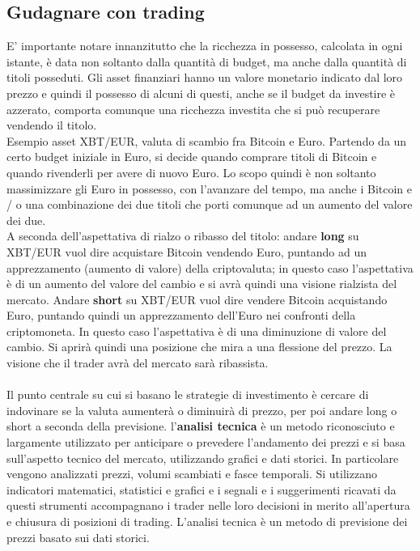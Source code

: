 \documentclass{article}
\begin{document}
	\subsection{Gudagnare con trading}
		E' importante notare innanzitutto che la ricchezza in possesso, calcolata in ogni istante, è data non soltanto dalla quantità di budget, ma anche dalla quantità di titoli posseduti. Gli asset finanziari hanno un valore monetario indicato dal loro prezzo e quindi il possesso di alcuni di questi, anche se il budget da investire è azzerato, comporta comunque una ricchezza investita che si può recuperare vendendo il titolo.\\
		Esempio asset XBT/EUR, valuta di scambio fra Bitcoin e Euro. Partendo da un certo budget iniziale in Euro, si decide quando comprare titoli di Bitcoin e quando rivenderli per avere di nuovo Euro. Lo scopo quindi è non soltanto massimizzare gli Euro in possesso, con l'avanzare del tempo, ma anche i Bitcoin e / o una combinazione dei due titoli che porti comunque ad un aumento del valore dei due.\\
		A seconda dell'aspettativa di rialzo o ribasso del titolo: andare \textbf{long} su XBT/EUR vuol dire acquistare Bitcoin vendendo Euro, puntando ad un apprezzamento (aumento di valore) della criptovaluta; in questo caso l’aspettativa è di un aumento del valore del cambio e si avrà quindi una visione rialzista del mercato. Andare \textbf{short} su XBT/EUR vuol dire vendere Bitcoin acquistando Euro, puntando quindi un apprezzamento dell'Euro nei confronti della criptomoneta. In questo caso l’aspettativa è di una diminuzione di valore del cambio. Si aprirà quindi una posizione che mira a una flessione del prezzo. La visione che il trader avrà del mercato sarà ribassista.\\~\\
		Il punto centrale su cui si basano le strategie di investimento è cercare di indovinare se la valuta aumenterà o diminuirà di prezzo, per poi andare long o short a seconda della previsione. l'\textbf{analisi tecnica} è un metodo riconosciuto e largamente utilizzato per anticipare o prevedere l'andamento dei prezzi e si basa sull'aspetto tecnico del mercato, utilizzando grafici e dati storici. In particolare vengono analizzati prezzi, volumi scambiati e fasce temporali. Si utilizzano indicatori matematici, statistici e grafici e i segnali e i suggerimenti ricavati da questi strumenti accompagnano i trader nelle loro decisioni in merito all'apertura e chiusura di posizioni di trading. L'analisi tecnica è un metodo di previsione dei prezzi basato sui dati storici.
\end{document}
